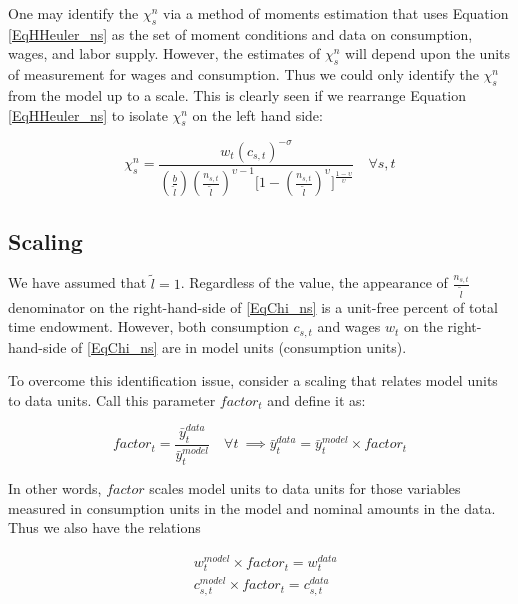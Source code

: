 \documentclass[letterpaper,12pt]{article}
\theoremstyle{definition}
\begin{document}
    One may identify the $\chi^{n}_{s}$ via a method of moments estimation that uses Equation \ref{EqHHeuler_ns} as the set of moment conditions and data on consumption, wages, and labor supply.  However, the estimates of $\chi^{n}_{s}$ will depend upon the units of measurement for wages and consumption.  Thus we could only identify the $\chi^{n}_{s}$ from the model up to a scale.  This is clearly seen if we rearrange Equation \ref{EqHHeuler_ns} to isolate $\chi^{n}_{s}$ on the left hand side:

    \begin{equation}\label{EqChi_ns}
      \chi^n_s = \frac{w_t\left(c_{s,t}\right)^{-\sigma}}{\left(\frac{b}{\tilde{l}}\right)\left(\frac{n_{s,t}}{\tilde{l}}\right)^{\upsilon-1}\Biggl[1 - \left(\frac{n_{s,t}}{\tilde{l}}\right)^\upsilon\Biggr]^{\frac{1-\upsilon}{\upsilon}}} \quad\forall s, t
    \end{equation}


  \subsection{Scaling}

    We have assumed that $\tilde{l}=1$. Regardless of the value, the appearance of $\frac{n_{s,t}}{\tilde{l}}$ denominator on the right-hand-side of \eqref{EqChi_ns} is a unit-free percent of total time endowment. However, both consumption $c_{s,t}$ and wages $w_t$ on the right-hand-side of \eqref{EqChi_ns} are in model units (consumption units).

    To overcome this identification issue, consider a scaling that relates model units to data units.  Call this parameter $factor_t$ and define it as:

    \begin{equation}\label{EqDataModelIncome}
      factor_t = \frac{\bar{y}^{data}_t}{\bar{y}^{model}_t} \quad\forall t \ \implies \bar{y}^{data}_t = \bar{y}^{model}_t \times factor_t
    \end{equation}

    In other words, $factor$ scales model units to data units for those variables measured in consumption units in the model and nominal amounts in the data.  Thus we also have the relations

    \begin{equation}
      \begin{split}
        & w^{model}_{t} \times factor_{t} = w^{data}_{t} \\
        & c^{model}_{s,t} \times factor_{t} = c^{data}_{s,t}
      \end{split}
    \end{equation}
\end{document}
